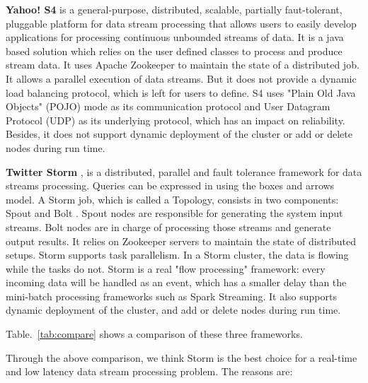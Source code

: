 \documentclass[	DIV=calc,%
							paper=a4,%
							fontsize=11pt,%
							twocolumn]{scrartcl}	 					%
\begin{document}
\textbf{Yahoo! S4} \cite{S4}  is a general-purpose, distributed, scalable, partially faut-tolerant, pluggable platform for data stream processing that allows users to easily develop applications for processing continuous unbounded streams of data. It is a java based solution which relies on the user defined classes to process and produce stream data. It uses Apache Zookeeper \cite{Zookeeper} to maintain the state of a distributed job. It allows a parallel execution of data streams. But it does not provide a dynamic load balancing protocol, which is left for users to define. S4 uses "Plain Old Java Objects" (POJO) mode as its communication protocol and User Datagram Protocol (UDP) as its underlying protocol, which has an impact on reliability. Besides, it does not support dynamic deployment of the cluster or add or delete nodes during run time.

 \textbf{Twitter Storm} \cite{4}, is a distributed, parallel and fault tolerance framework for data streams processing. Queries can be expressed in using the boxes and arrows model. A Storm job, which is called a Topology, consists in two components: Spout and Bolt . Spout nodes are responsible for generating the system input streams. Bolt nodes are in charge of processing those streams and generate output results. It relies on Zookeeper servers to maintain the state of distributed setups. Storm supports task parallelism. In a Storm cluster, the data is flowing while the tasks do not. Storm is a real "flow processing" framework: every incoming data will be handled as an event, which has a smaller delay than the mini-batch processing frameworks such as Spark Streaming. It also supports dynamic deployment of the cluster, and add or delete nodes during run time.
 
 Table.~\ref{tab:compare} shows a comparison of these three frameworks.

Through the above comparison, we think Storm is the best choice for a real-time and low latency data stream processing problem. The reasons are:
\end{document}
